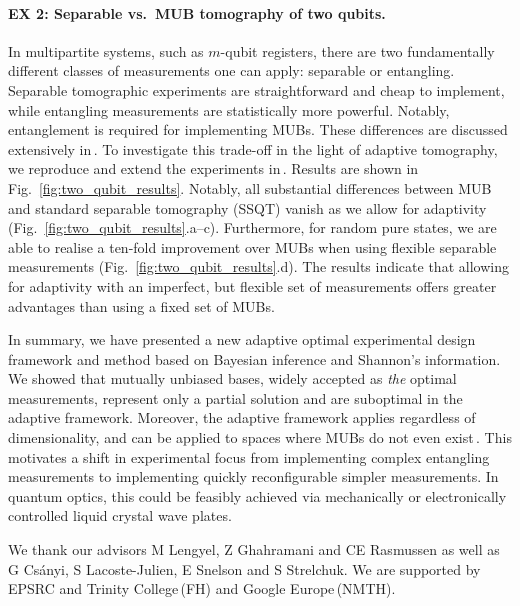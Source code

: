 \documentclass[aps,twocolumn,prl]{revtex4-1}
\begin{document}
\paragraph{EX 2: Separable vs.\ MUB tomography of two qubits.} In multipartite systems, such as $m$-qubit registers, there are two fundamentally different classes of measurements one can apply: separable or entangling. Separable tomographic experiments are straightforward and cheap to implement, while entangling measurements are statistically more powerful. Notably, entanglement is required for implementing MUBs. These differences are discussed extensively in\,\cite{MUBExperiment}. To investigate this trade-off in the light of adaptive tomography, we reproduce and extend the experiments in\,\cite{MUBExperiment}. Results are shown in Fig.\ \ref{fig:two_qubit_results}. Notably, all substantial differences between MUB and standard separable tomography (SSQT) vanish as we allow for adaptivity (Fig.\ \ref{fig:two_qubit_results}.a--c). Furthermore, for random pure states, we are able to realise a ten-fold improvement over MUBs when using flexible separable measurements (Fig.\ \ref{fig:two_qubit_results}.d). The results indicate that allowing for adaptivity with an imperfect, but flexible set of measurements offers greater advantages than using a fixed set of MUBs.


In summary, we have presented a new adaptive optimal experimental design framework and method based on Bayesian inference and Shannon's information. We showed that mutually unbiased bases, widely accepted as \emph{the} optimal measurements, represent only a partial solution and are suboptimal in the adaptive framework. Moreover, the adaptive framework applies regardless of dimensionality, and can be applied to spaces where MUBs do not even exist\,\cite{DimensionSix,ExactInformation}. This motivates a shift in experimental focus from implementing complex entangling measurements to implementing quickly reconfigurable simpler measurements. In quantum optics, this could be feasibly achieved via mechanically or electronically controlled liquid crystal wave plates.

\begin{acknowledgments}
We thank our advisors M Lengyel, Z Ghahramani and CE Rasmussen as well as G Cs\'{a}nyi, S Lacoste-Julien, E Snelson and S Strelchuk. We are supported by EPSRC and Trinity College\,(FH) and Google Europe\,(NMTH).
\end{acknowledgments}


\end{document}
